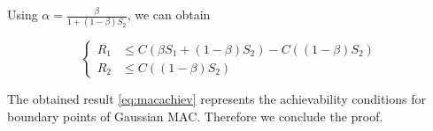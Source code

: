 Using $\alpha = \frac{\beta}{1+ (1-\beta) S_2}$, we can obtain

\begin{equation}
\begin{cases}
	R_1 &\leq C (\beta S_1 + (1-\beta)S_2) - C((1-\beta)S_2) \\
	R_2  &\leq   C \left( (1-\beta)S_2 \right)
\end{cases}
\label{eq:macachiev}
\end{equation}

The obtained result \eqref{eq:macachiev} represents the achievability conditions for boundary points of Gaussian MAC. Therefore we conclude the proof.
